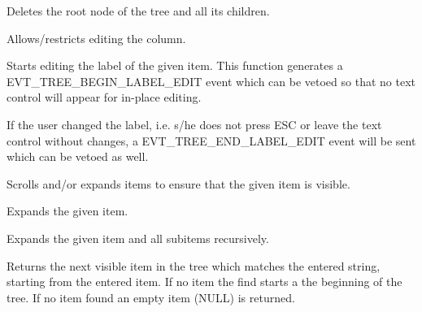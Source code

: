 
Deletes the root node of the tree and all its children.

\label{wxtreelistctrleditablecolumn}


Allows/restricts editing the column.

\label{wxtreelistctrleditlabel}


Starts editing the label of the given item. This function generates a
EVT\_TREE\_BEGIN\_LABEL\_EDIT event which can be vetoed so that no
text control will appear for in-place editing.

If the user changed the label, i.e. s/he does not press ESC or leave
the text control without changes, a EVT\_TREE\_END\_LABEL\_EDIT event
will be sent which can be vetoed as well.



\label{wxtreelistctrlensurevisible}


Scrolls and/or expands items to ensure that the given item is visible.

\label{wxtreelistctrlexpand}


Expands the given item.

\label{wxtreelistctrlexpandall}


Expands the given item and all subitems recursively.

\label{wxtreelistctrlfinditem}


Returns the next visible item in the tree which matches the entered string, starting from
the entered item. If no item the find starts a the beginning of the tree. If no item found
an empty item (NULL) is returned.

